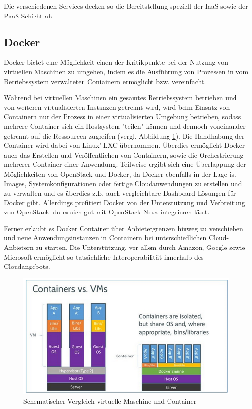 Die verschiedenen Services decken so die Bereitstellung speziell der IaaS sowie der PaaS Schicht ab. \cite{openStack}

\subsection{Docker}
Docker bietet eine Möglichkeit einen der Kritikpunkte bei der Nutzung von virtuellen Maschinen zu umgehen, indem es die Ausführung von Prozessen in vom Betriebssystem verwalteten Containern ermöglicht bzw. vereinfacht.

Während bei virtuellen Maschinen ein gesamtes Betriebssystem betrieben und von weiteren virtualisierten Instanzen getrennt wird, wird beim Einsatz von Containern nur der Prozess in einer virtualisierten Umgebung betrieben, sodass mehrere Container sich ein Hostsystem "teilen" können und dennoch voneinander getrennt auf die Ressourcen zugreifen (vergl. Abbildung \ref{fig:docker}). Die Handhabung der Container wird dabei von Linux' LXC übernommen. Überdies ermöglicht Docker auch das Erstellen und Veröffentlichen von Containern, sowie die Orchestrierung mehrerer Container einer Anwendung. Teilweise ergibt sich eine Überlappung der Möglichkeiten von OpenStack und Docker, da Docker ebenfalls in der Lage ist Images, Systemkonfigurationen oder fertige Cloudanwendungen zu erstellen und zu verwalten und es überdies z.B. auch vergleichbare Dashboard Lösungen für Docker gibt. Allerdings profitiert Docker von der Unterstützung und Verbreitung von OpenStack, da es sich gut mit OpenStack Nova integrieren lässt. \cite{dockerZdnet}

Ferner erlaubt es Docker Container über Anbietergrenzen hinweg zu verschieben und neue Anwendungsinstanzen in Containern bei unterschiedlichen Cloud-Anbietern zu starten. Die Unterstützung, vor allem durch Amazon, Google sowie Microsoft ermöglicht so tatsächliche Interoperabilität innerhalb des Cloudangebots.

\begin{figure}
	\centering
	\includegraphics[width=0.8\linewidth]{images/docker-vm-container}
	\caption{Schematischer Vergleich virtuelle Maschine und Container}
	\label{fig:docker}
\end{figure}

